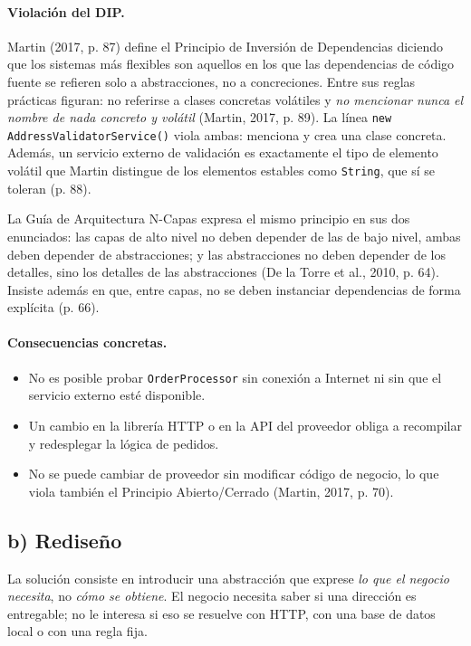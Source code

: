 \documentclass[11pt,a4paper]{article}
\begin{document}
\paragraph{Violación del DIP.} Martin (2017, p. 87) define el Principio de Inversión de Dependencias diciendo que los sistemas más flexibles son aquellos en los que las dependencias de código fuente se refieren solo a abstracciones, no a concreciones. Entre sus reglas prácticas figuran: no referirse a clases concretas volátiles y \emph{no mencionar nunca el nombre de nada concreto y volátil} (Martin, 2017, p. 89). La línea \texttt{new AddressValidatorService()} viola ambas: menciona y crea una clase concreta. Además, un servicio externo de validación es exactamente el tipo de elemento volátil que Martin distingue de los elementos estables como \texttt{String}, que sí se toleran (p. 88).

La Guía de Arquitectura N-Capas expresa el mismo principio en sus dos enunciados: las capas de alto nivel no deben depender de las de bajo nivel, ambas deben depender de abstracciones; y las abstracciones no deben depender de los detalles, sino los detalles de las abstracciones (De la Torre et al., 2010, p. 64). Insiste además en que, entre capas, no se deben instanciar dependencias de forma explícita (p. 66).

\paragraph{Consecuencias concretas.}
\begin{itemize}[leftmargin=1.5em]
  \item No es posible probar \texttt{OrderProcessor} sin conexión a Internet ni sin que el servicio externo esté disponible.
  \item Un cambio en la librería HTTP o en la API del proveedor obliga a recompilar y redesplegar la lógica de pedidos.
  \item No se puede cambiar de proveedor sin modificar código de negocio, lo que viola también el Principio Abierto/Cerrado (Martin, 2017, p. 70).
\end{itemize}

\subsection{b) Rediseño}

La solución consiste en introducir una abstracción que exprese \emph{lo que el negocio necesita}, no \emph{cómo se obtiene}. El negocio necesita saber si una dirección es entregable; no le interesa si eso se resuelve con HTTP, con una base de datos local o con una regla fija.
\end{document}
